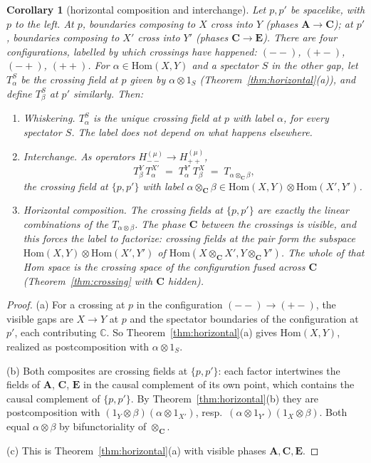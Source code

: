 \documentclass[11pt]{article}
\newtheorem{corollary}[theorem]{Corollary}
\theoremstyle{definition}
\theoremstyle{remark}
\newcommand{\bfA}{\mathbf A}
\newcommand{\bfC}{\mathbf C}
\newcommand{\bfE}{\mathbf E}
\begin{document}
\begin{corollary}[horizontal composition and interchange]\label{cor:interchange}
Let $p,p'$ be spacelike, with $p$ to the left. At $p$, boundaries composing to $X$ cross into $Y$ (phases $\bfA\to\bfC$); at $p'$, boundaries composing to $X'$ cross into $Y'$ (phases $\bfC\to\bfE$). There are four configurations, labelled by which crossings have happened: $(--)$, $(+-)$, $(-+)$, $(++)$. For $\alpha\in\mathrm{Hom}(X,Y)$ and a spectator $S$ in the other gap, let $T^{S}_\alpha$ be the crossing field at $p$ given by $\alpha\otimes1_S$ (Theorem~\ref{thm:horizontal}(a)), and define $T^S_\beta$ at $p'$ similarly. Then:
\begin{enumerate}[nosep,label=(\alph*)]
\item \emph{Whiskering.} $T^S_\alpha$ is the unique crossing field at $p$ with label $\alpha$, for every spectator $S$. The label does not depend on what happens elsewhere.
\item \emph{Interchange.} As operators $H_{--}^{(\mu)}\to H_{++}^{(\mu)}$,
\[
T^{Y}_\beta\,T^{X'}_\alpha\;=\;T^{Y'}_\alpha\,T^{X}_\beta\;=\;T_{\alpha\otimes_{\bfC}\beta},
\]
the crossing field at $\{p,p'\}$ with label $\alpha\otimes_{\bfC}\beta\in\mathrm{Hom}(X,Y)\otimes\mathrm{Hom}(X',Y')$.
\item \emph{Horizontal composition.} The crossing fields at $\{p,p'\}$ are exactly the linear combinations of the $T_{\alpha\otimes\beta}$. The phase $\bfC$ between the crossings is visible, and this forces the label to factorize: crossing fields at the pair form the subspace $\mathrm{Hom}(X,Y)\otimes\mathrm{Hom}(X',Y')$ of $\mathrm{Hom}(X\otimes_{\bfC}X',Y\otimes_{\bfC}Y')$. The whole of that Hom space is the crossing space of the configuration fused across $\bfC$ (Theorem~\ref{thm:crossing} with $\bfC$ hidden).
\end{enumerate}
\end{corollary}
\begin{proof}
(a) For a crossing at $p$ in the configuration $(--)\to(+-)$, the visible gaps are $X\to Y$ at $p$ and the spectator boundaries of the configuration at $p'$, each contributing $\mathbb C$. So Theorem~\ref{thm:horizontal}(a) gives $\mathrm{Hom}(X,Y)$, realized as postcomposition with $\alpha\otimes1_S$.

(b) Both composites are crossing fields at $\{p,p'\}$: each factor intertwines the fields of $\bfA$, $\bfC$, $\bfE$ in the causal complement of its own point, which contains the causal complement of $\{p,p'\}$. By Theorem~\ref{thm:horizontal}(b) they are postcomposition with $(1_Y\otimes\beta)(\alpha\otimes1_{X'})$, resp.\ $(\alpha\otimes1_{Y'})(1_X\otimes\beta)$. Both equal $\alpha\otimes\beta$ by bifunctoriality of $\otimes_{\bfC}$.

(c) This is Theorem~\ref{thm:horizontal}(a) with visible phases $\bfA,\bfC,\bfE$.
\end{proof}
\end{document}
